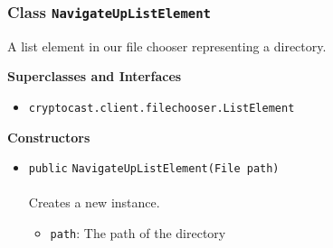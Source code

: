 \subsubsection{Class \lstinline|NavigateUpListElement|}
A list element in our file chooser representing a directory. \\
\noindent\begin{minipage}[t]{5cm}
\vspace{0.3em}
\hspace*{2em}
\vspace{0.3em}
\end{minipage}



\textbf{\sffamily Superclasses and Interfaces}
\begin{itemize}
\item \lstinline|cryptocast.client.filechooser.ListElement|
\end{itemize}


\textbf{\sffamily Constructors}
\begin{itemize}
\item \lstinline|public| \lstinline|NavigateUpListElement|\lstinline|(File path)|\\ \\[-0.6em]
Creates a new instance.
\begin{itemize}
\item \lstinline|path|: The path of the directory
\end{itemize}



\end{itemize}


